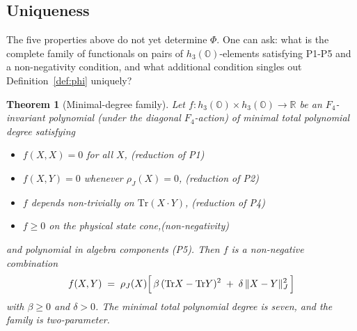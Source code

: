\documentclass[12pt]{article}
\newtheorem{theorem}{Theorem}
\theoremstyle{remark}
\newcommand{\hthree}{h_3(\mathbb{O})}
\newcommand{\Ffour}{F_4}
\newcommand{\rhoJ}{\rho_J}
\newcommand{\Phiexp}{\Phi}
\newcommand{\Tr}{\mathrm{Tr}}
\newcommand{\Jnorm}[1]{\lVert #1 \rVert_J}
\begin{document}
\subsection{Uniqueness}
\label{sec:uniqueness}

The five properties above do not yet determine $\Phiexp$. One can ask:
what is the complete family of functionals on pairs of $\hthree$-elements
satisfying P1-P5 and a non-negativity condition, and what additional
condition singles out Definition~\ref{def:phi} uniquely?

\begin{theorem}[Minimal-degree family]\label{thm:phi-family}
Let $f : \hthree \times \hthree \to \mathbb{R}$ be an $\Ffour$-invariant
polynomial (under the diagonal $\Ffour$-action) of minimal total
polynomial degree satisfying
\begin{itemize}[leftmargin=2em]
\item $f(X, X) = 0$ for all $X$, \hfill (reduction of P1)
\item $f(X, Y) = 0$ whenever $\rhoJ(X) = 0$, \hfill (reduction of P2)
\item $f$ depends non-trivially on $\Tr(X \cdot Y)$, \hfill (reduction of P4)
\item $f \geq 0$ on the physical state cone,\hfill (non-negativity)
\end{itemize}
and polynomial in algebra components (P5). Then $f$ is a non-negative
combination
\begin{equation}\label{eq:phi-family}
  f(X, Y) \;=\; \rhoJ(X)\Bigl[\,\beta\,(\Tr X - \Tr Y)^2 \;+\; \delta\,\Jnorm{X - Y}^2\,\Bigr]
\end{equation}
with $\beta \geq 0$ and $\delta > 0$. The minimal total polynomial degree
is seven, and the family is two-parameter.
\end{theorem}
\end{document}
